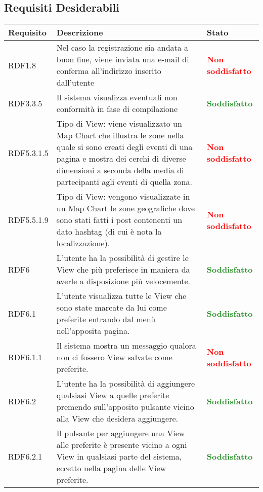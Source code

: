 \subsection{Requisiti Desiderabili}
\begin{center}

	\def\arraystretch{1.5}
	\bgroup
	\begin{longtable}{| p{2.5cm} | p{8cm} | p{3.5cm} |}
		\hline
		\textbf{Requisito} & \textbf{Descrizione} & \textbf{Stato} \\
		\hline
		RDF1.8  &  Nel caso la registrazione sia andata a buon fine, viene inviata una e-mail di conferma all'indirizzo inserito dall'utente  &  \textbf{\textbf{\textcolor{red}{Non soddisfatto}}} \\
		\hline
		RDF3.3.5  &  Il sistema visualizza eventuali non conformità in fase di compilazione  &  \textbf{\textcolor{forestgreen}{Soddisfatto}} \\
		\hline
		RDF5.3.1.5  &  Tipo di View: viene visualizzato un Map Chart che illustra le zone nella quale si sono creati degli eventi di una pagina e mostra dei cerchi di diverse dimensioni a seconda della media di partecipanti agli eventi di quella zona. & \textbf{\textcolor{red}{Non soddisfatto}} \\
		\hline
		RDF5.5.1.9  &  Tipo di View: vengono visualizzate in un Map Chart le zone geografiche dove sono stati fatti i post contenenti un dato hashtag (di cui è nota la localizzazione). & \textbf{\textcolor{red}{Non soddisfatto}} \\
		\hline
		RDF6  & L'utente ha la possibilità di gestire le View che più preferisce in maniera da averle a disposizione più velocemente. &  \textbf{\textcolor{forestgreen}{Soddisfatto}} \\
		\hline
		RDF6.1  & L'utente visualizza tutte le View che sono state marcate da lui come preferite entrando dal menù nell'apposita pagina. & \textbf{\textcolor{forestgreen}{Soddisfatto}} \\
		\hline
		RDF6.1.1  & Il sistema mostra un messaggio qualora non ci fossero View salvate come preferite. &  \textbf{\textcolor{red}{Non soddisfatto}} \\
		\hline
		RDF6.2  & L'utente ha la possibilità di aggiungere qualsiasi View a quelle preferite premendo sull'apposito pulsante vicino alla View che desidera aggiungere. & \textbf{\textcolor{forestgreen}{Soddisfatto}} \\
		\hline
		RDF6.2.1  & Il pulsante per aggiungere una View alle preferite è presente vicino a ogni View in qualsiasi parte del sistema, eccetto nella pagina delle View preferite.  & \textbf{\textcolor{forestgreen}{Soddisfatto}} \\

\end{longtable}
\end{center}
